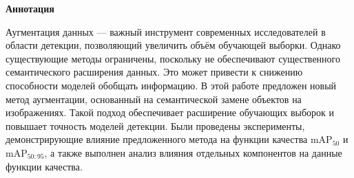 \begin{center}
    \Large{\textbf{Аннотация}}
\end{center}
Аугментация данных — важный инструмент современных исследователей в области детекции, позволяющий увеличить объём обучающей выборки. Однако существующие методы ограничены, поскольку не обеспечивают существенного семантического расширения данных. Это может привести к снижению способности моделей обобщать информацию. В этой работе предложен новый метод аугментации, основанный на семантической замене объектов на изображениях. Такой подход обеспечивает расширение обучающих выборок и повышает точность моделей детекции. Были проведены эксперименты, демонстрирующие влияние предложенного метода на функции качества $\text{mAP}_{50}$ и $\text{mAP}_{50:95}$, а также выполнен анализ влияния отдельных компонентов на данные функции качества.